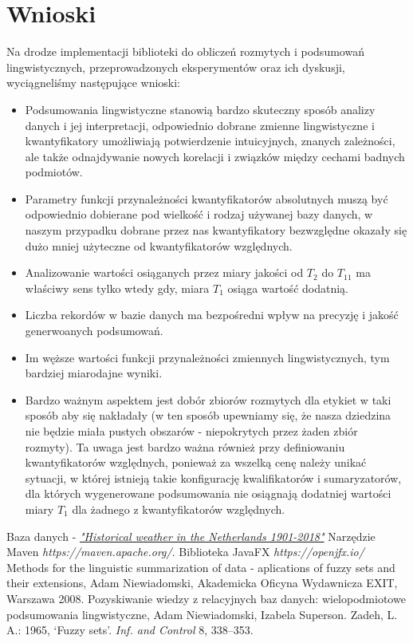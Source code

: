 \documentclass{classrep}
\begin{document}
\section{Wnioski}
Na drodze implementacji biblioteki do obliczeń rozmytych i podsumowań lingwistycznych, przeprowadzonych eksperymentów oraz ich dyskusji, wyciągneliśmy następujące wnioski:
\begin{itemize}[label=$\bullet$\scshape\bfseries]
\item Podsumowania lingwistyczne stanowią bardzo skuteczny sposób analizy danych i jej interpretacji, odpowiednio dobrane zmienne lingwistyczne i kwantyfikatory umożliwiają potwierdzenie intuicyjnych, znanych zależności, ale także odnajdywanie nowych korelacji i związków między cechami badnych podmiotów.
\item Parametry funkcji przynależności kwantyfikatorów absolutnych muszą być odpowiednio dobierane pod wielkość i rodzaj używanej bazy danych, w naszym przypadku dobrane przez nas kwantyfikatory bezwzględne okazały się dużo mniej użyteczne od kwantyfikatorów względnych.
\item Analizowanie wartości osiąganych przez miary jakości od $T_2$ do $T_11$ ma właściwy sens tylko wtedy gdy, miara $T_1$ osiąga wartość dodatnią.
\item Liczba rekordów w bazie danych ma bezpośredni wpływ na precyzję i jakość generwoanych podsumowań.
\item Im węższe wartości funkcji przynależności zmiennych lingwistycznych, tym bardziej miarodajne wyniki.
\item Bardzo ważnym aspektem jest dobór zbiorów rozmytych dla etykiet w taki sposób aby się nakładały (w ten sposób upewniamy się, że nasza dziedzina nie będzie miała pustych obszarów - niepokrytych przez żaden zbiór rozmyty). Ta uwaga jest bardzo ważna również przy definiowaniu kwantyfikatorów względnych, ponieważ za wszelką cenę należy unikać sytuacji, w której istnieją takie konfigurację kwalifikatorów i sumaryzatorów, dla których wygenerowane podsumowania nie osiągnają dodatniej wartości miary $T_1$ dla żadnego z kwantyfikatorów względnych.
\end{itemize}


\begin{thebibliography}{5}
Baza danych - 
\href{https://www.kaggle.com/sinaasappel/historical-weather-in-the-netherlands-19012018}{\textit{"Historical weather in the Netherlands 1901-2018"}}
Narzędzie Maven\newline
\textit{https://maven.apache.org/}. 
Biblioteka JavaFX\newline
\textit{https://openjfx.io/}
Methods for the linguistic summarization of data - aplications of fuzzy sets and their extensions, Adam Niewiadomski, Akademicka Oficyna Wydawnicza EXIT, Warszawa 2008.
Pozyskiwanie wiedzy z relacyjnych baz danych: wielopodmiotowe podsumowania lingwistyczne, Adam Niewiadomski, Izabela Superson.
Zadeh, L. A.: 1965, ‘Fuzzy sets’.  \textit{Inf. and Control} 8, 338–353.
\end{thebibliography}
\end{document}
